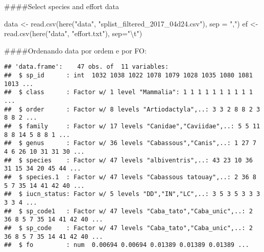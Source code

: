 \documentclass[
]{article}
\newenvironment{Shaded}{\begin{snugshade}}{\end{snugshade}}
\newcommand{\AttributeTok}[1]{\textcolor[rgb]{0.77,0.63,0.00}{#1}}
\newcommand{\FunctionTok}[1]{\textcolor[rgb]{0.00,0.00,0.00}{#1}}
\newcommand{\NormalTok}[1]{#1}
\newcommand{\OtherTok}[1]{\textcolor[rgb]{0.56,0.35,0.01}{#1}}
\newcommand{\SpecialCharTok}[1]{\textcolor[rgb]{0.00,0.00,0.00}{#1}}
\newcommand{\StringTok}[1]{\textcolor[rgb]{0.31,0.60,0.02}{#1}}
\begin{document}
\#\#\#\#Select species and effort data

\begin{Shaded}
\begin{Highlighting}[]
\NormalTok{data }\OtherTok{\textless{}{-}} \FunctionTok{read.csv}\NormalTok{(}\FunctionTok{here}\NormalTok{(}\StringTok{"data"}\NormalTok{, }\StringTok{"splist\_filtered\_2017\_04d24.csv"}\NormalTok{), }\AttributeTok{sep =} \StringTok{","}\NormalTok{)}
\NormalTok{ef }\OtherTok{\textless{}{-}} \FunctionTok{read.csv}\NormalTok{(}\FunctionTok{here}\NormalTok{(}\StringTok{"data"}\NormalTok{, }\StringTok{"effort.txt"}\NormalTok{), }\AttributeTok{sep=}\StringTok{"}\SpecialCharTok{\textbackslash{}t}\StringTok{"}\NormalTok{)}
\end{Highlighting}
\end{Shaded}

\#\#\#\#Ordenando data por ordem e por FO:

\begin{Shaded}
\end{Shaded}

\begin{verbatim}
## 'data.frame':    47 obs. of  11 variables:
##  $ sp_id      : int  1032 1038 1022 1078 1079 1028 1035 1080 1081 1013 ...
##  $ class      : Factor w/ 1 level "Mammalia": 1 1 1 1 1 1 1 1 1 1 ...
##  $ order      : Factor w/ 8 levels "Artiodactyla",..: 3 3 2 8 8 2 3 8 8 2 ...
##  $ family     : Factor w/ 17 levels "Canidae","Caviidae",..: 5 5 11 8 8 14 5 8 8 1 ...
##  $ genus      : Factor w/ 36 levels "Cabassous","Canis",..: 1 27 7 4 6 26 10 31 31 30 ...
##  $ species    : Factor w/ 47 levels "albiventris",..: 43 23 10 36 31 15 34 20 45 44 ...
##  $ species.1  : Factor w/ 47 levels "Cabassous tatouay",..: 2 36 8 5 7 35 14 41 42 40 ...
##  $ iucn_status: Factor w/ 5 levels "DD","IN","LC",..: 3 5 3 5 3 3 3 3 3 4 ...
##  $ sp_code1   : Factor w/ 47 levels "Caba_tato","Caba_unic",..: 2 36 8 5 7 35 14 41 42 40 ...
##  $ sp_code    : Factor w/ 47 levels "Caba_tato","Caba_unic",..: 2 36 8 5 7 35 14 41 42 40 ...
##  $ fo         : num  0.00694 0.00694 0.01389 0.01389 0.01389 ...
\end{verbatim}

\begin{Shaded}
\end{Shaded}
\end{document}
